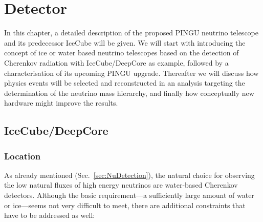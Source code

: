 \chapter{Detector}
\label{sec:det}

In this chapter, a detailed description of the proposed PINGU neutrino
telescope and its predecessor IceCube will be given. We will start with
introducing the concept of ice or water based neutrino telescopes based on the
detection of Cherenkov radiation with IceCube/DeepCore as example, followed by
a characterisation of its upcoming PINGU upgrade.
Thereafter we will discuss how physics events will be selected and
reconstructed in an analysis targeting the determination of the neutrino mass
hierarchy, and finally how conceptually new hardware might improve the results.

\section{IceCube/DeepCore}
\label{sec:ICDC}

\subsection{Location}
\label{sec:IClocation}

As already mentioned (Sec.~\ref{sec:NuDetection}), the natural choice for
observing the low natural fluxes of high energy neutrinos are water-based
Cherenkov detectors. Although the basic requirement---a sufficiently large
amount of water or ice---seems not very difficult to meet, there are additional
constraints that have to be addressed as well:

